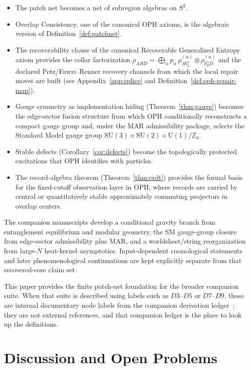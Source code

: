 \documentclass[11pt]{article}
\theoremstyle{remark}
\theoremstyle{plain}
\begin{document}
\begin{itemize}
\item The patch net becomes a net of subregion algebras on $S^2$.
\item Overlap Consistency, one of the canonical OPH axioms, is the algebraic version of Definition~\ref{def:patchnet}.
\item The recoverability clause of the canonical Recoverable Generalized Entropy axiom provides the collar factorization $\rho_{ABD} = \bigoplus_\alpha p_\alpha\,\rho^{(\alpha)}_{Ab_L^\alpha}\otimes\rho^{(\alpha)}_{b_R^\alpha D}$ and the declared Petz/Fawzi--Renner recovery channels from which the local repair moves are built (see Appendix~\ref{app:splice} and Definition~\ref{def:oph-repair-map}).
\item Gauge symmetry as implementation hiding (Theorem~\ref{thm:gauge}) becomes the edge-sector fusion structure from which OPH conditionally reconstructs a compact gauge group and, under the MAR admissibility package, selects the Standard Model gauge group $\mathrm{SU}(3)\times\mathrm{SU}(2)\times\mathrm{U}(1)/\mathbb{Z}_6$.
\item Stable defects (Corollary~\ref{cor:defects}) become the topologically protected excitations that OPH identifies with particles.
\item The record-algebra theorem (Theorem~\ref{thm:crdt}) provides the formal basis for the fixed-cutoff observation layer in OPH, where records are carried by central or quantitatively stable approximately commuting projectors in overlap centers.
\end{itemize}

The companion manuscripts develop a conditional gravity branch from entanglement equilibrium and modular geometry, the SM gauge-group closure from edge-sector admissibility plus MAR, and a worldsheet/string reorganization from large-$N$ heat-kernel asymptotics. Input-dependent cosmological statements and later phenomenological continuations are kept explicitly separate from that recovered-core claim set.

This paper provides the finite patch-net foundation for the broader companion suite. When that
suite is described using labels such as \(D3\)--\(D5\) or \(D7\)--\(D9\), those are internal
documentary node labels from the companion derivation ledger~\cite{OPH}; they are not external
references, and that companion ledger is the place to look up the definitions.


\section{Discussion and Open Problems}
\end{document}
